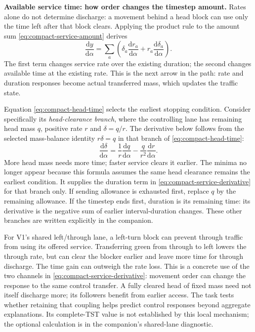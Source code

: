 \documentclass[10pt,a4paper]{article}
\begin{document}
\textbf{Available service time: how order changes the timestep amount.}
Rates alone do not determine discharge: a movement behind a head block
can use only the time left after that block clears.
Applying the product rule to the amount sum \eqref{eq:compact-service-amount} derives
\begin{equation}
 \frac{\mathrm dy}{\mathrm d\alpha}
 =\sum_a\left(\delta_a\frac{\mathrm dr_a}{\mathrm d\alpha}
              +r_a\frac{\mathrm d\delta_a}{\mathrm d\alpha}\right).
 \label{eq:compact-service-derivative}
\end{equation}
The first term changes service rate over the existing duration; the
second changes available time at the existing rate. This is the next
arrow in the path: rate and duration responses become actual transferred
mass, which updates the traffic state.

Equation \eqref{eq:compact-head-time} selects the earliest stopping
condition. Consider specifically its \emph{head-clearance branch}, where
the controlling lane has remaining head mass $q$, positive rate $r$ and
$\delta=q/r$.
The derivative below follows from the selected mass-balance identity $r\delta=q$ in that branch of \eqref{eq:compact-head-time}:
\begin{equation}
 \frac{\mathrm d\delta}{\mathrm d\alpha}
 =\frac1r\frac{\mathrm dq}{\mathrm d\alpha}
      -\frac q{r^2}\frac{\mathrm dr}{\mathrm d\alpha}.
 \label{eq:compact-head-time-derivative}
\end{equation}
More head mass needs more time; faster service clears it earlier.
The minima no longer appear because this formula assumes the same head
clearance remains the earliest condition. It supplies the duration term
in \eqref{eq:compact-service-derivative} for that branch only.
If sending allowance is exhausted first, replace $q$ by the remaining
allowance. If the timestep ends first, duration is its remaining time:
its derivative is the negative sum of earlier interval-duration changes.
These other branches are written explicitly in the companion.

For V1's shared left/through lane, a left-turn block can prevent through
traffic from using its offered service. Transferring green from through
to left lowers the through rate, but can clear the blocker earlier and
leave more time for through discharge. The time gain can outweigh the
rate loss. This is a concrete use of the two channels in
\eqref{eq:compact-service-derivative}: movement order can change the
response to the same control transfer. A fully cleared head of fixed
mass need not itself discharge more; its followers benefit from earlier
access. The task tests whether retaining that coupling helps predict
control responses beyond aggregate explanations. Its complete-TST value
is not established by this local mechanism; the optional calculation is
in the companion's shared-lane diagnostic.
\end{document}

